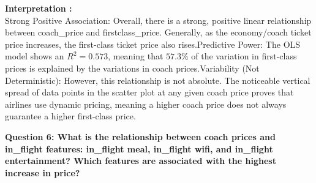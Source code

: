 \documentclass[11pt,a4paper]{article}
\begin{document}
\noindent \textbf{Interpretation :} \\
Strong Positive Association: Overall, there is a strong, positive linear relationship between coach\_price and firstclass\_price. Generally, as the economy/coach ticket price increases, the first-class ticket price also rises.Predictive Power: The OLS model shows an $R^2 = 0.573$, meaning that $57.3\%$ of the variation in first-class prices is explained by the variations in coach prices.Variability (Not Deterministic): However, this relationship is not absolute. The noticeable vertical spread of data points in the scatter plot at any given coach price proves that airlines use dynamic pricing, meaning a higher coach price does not always guarantee a higher first-class price.
\vspace{2.5em}

\noindent \textbf{\large Question 6:
What is the relationship between coach prices and in\_flight features: in\_flight meal, in\_flight wifi, and in\_flight entertainment? Which features are associated with the highest increase in price?}
\end{document}

